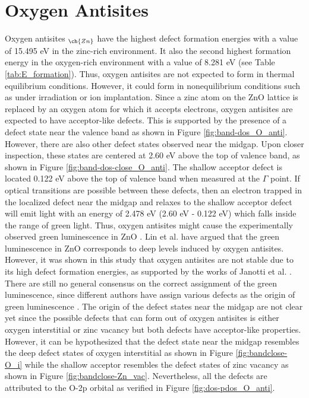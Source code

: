 \clearpage

\section{Oxygen Antisites}
Oxygen antisites $_{\ch{Zn}}$ have the highest defect formation energies with a value of 15.495 eV in the zinc-rich environment. It also the second highest formation energy in the oxygen-rich environment with a value of 8.281 eV (see Table \ref{tab:E_formation}). Thus, oxygen antisites are not expected to form in thermal equilibrium conditions. However, it could form in nonequilibrium conditions such as under irradiation or ion implantation. Since a zinc atom on the ZnO lattice is replaced by an oxygen atom for which it accepts electrons, oxygen antisites are expected to have acceptor-like defects. This is supported by the presence of a defect state near the valence band as shown in Figure \ref{fig:band-dos_O_anti}.  However, there are also other defect states observed near the midgap. Upon closer inspection, these states are centered at 2.60 eV above the top of valence band, as shown in Figure \ref{fig:band-dos-close_O_anti}. The shallow acceptor defect is located 0.122 eV above the top of valence band when measured at the $\Gamma$ point. If optical transitions are possible between these defects, then an electron trapped in the localized defect near the midgap and relaxes to the shallow acceptor defect will emit light with an energy of 2.478 eV  (2.60 eV - 0.122 eV) which falls inside the range of green light. Thus, oxygen antisites might cause the experimentally observed  green luminescence in ZnO \citep{Djurisic2007,Empizo2014,Cizek2015}. Lin et al. \citep{Lin2001} have argued that the green luminescence in ZnO corresponds to deep levels induced by oxygen antisites. However, it was shown in this study that oxygen antisites are not stable due to its high defect formation energies, as supported by the works of Janotti et al. \citep{Janotti2007}. There are still no general consensus on the correct assignment of the green luminescence, since different authors have assign various defects as the origin of green luminescence \citep{Reynolds1997,Oezguer2005,Djurisic2007}. The origin of the defect states near the midgap are not clear yet since the possible defects that can form out of oxygen antisites is either oxygen interstitial or zinc vacancy but both defects have acceptor-like properties. However, it can be hypothesized that the defect state near the midgap resembles the deep defect states of oxygen interstitial as shown in Figure \ref{fig:bandclose-O_i} while the shallow acceptor resembles the defect states of zinc vacancy as shown in Figure \ref{fig:bandclose-Zn_vac}. Nevertheless, all the defects are attributed to the O-2p orbital as  verified in Figure \ref{fig:dos-pdos_O_anti}.


